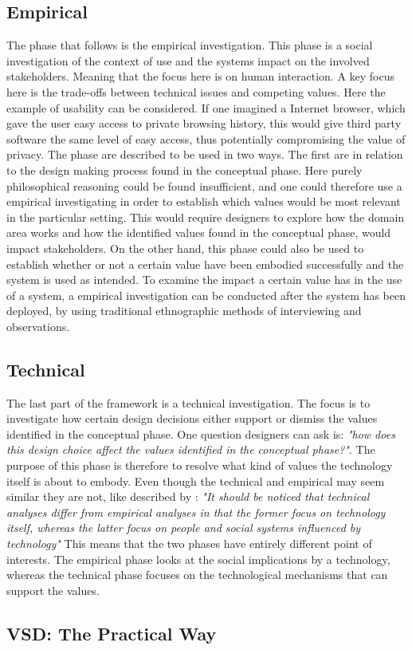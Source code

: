 \subsection{Empirical}
The phase that follows is the empirical investigation. This phase is a social investigation of the context of use and the systems impact on the involved stakeholders. Meaning that the focus here is on human interaction. A key focus here is the trade-offs between technical issues and competing values. Here the example of usability can be considered. If one imagined a Internet browser, which gave the user easy access to private browsing history, this would give third party software the same level of easy access, thus potentially compromising the value of privacy.\newline
The phase are described to be used in two ways. The first are in relation to the design making process found in the conceptual phase. Here purely philosophical reasoning could be found insufficient, and one could therefore use a empirical investigating in order to establish which values would be most relevant in the particular setting. This would require designers to explore how the domain area works and how the identified values found in the conceptual phase, would impact stakeholders. \newline
On the other hand, this phase could also be used to establish whether or not a certain value have been embodied successfully and the system is used as intended. To examine the impact a certain value has in the use of a system, a empirical investigation can be conducted after the system has been deployed, by using traditional ethnographic methods of interviewing and observations.

\subsection{Technical}
The last  part of the framework is a technical investigation. The focus is to investigate how certain design decisions either support or dismiss the values identified in the conceptual phase. One question designers can ask is: \textit{"how does this design choice affect the values identified in the conceptual phase?"}. The purpose of this phase is therefore to resolve what kind of values the technology itself is about to embody. Even though the technical and empirical may seem similar they are not, like described by \citet[p. 67]{EthicsAndTechnologyDesign}: \textit{"It should be noticed that technical analyses differ from empirical analyses in that the former focus on technology itself, whereas the latter focus on people and social systems influenced by technology"}\newline
This means that the two phases have entirely different point of interests. The empirical phase looks at the social implications by a technology, whereas the technical phase focuses on the technological mechanisms that can support the values. 

\subsection{VSD: The Practical Way}

